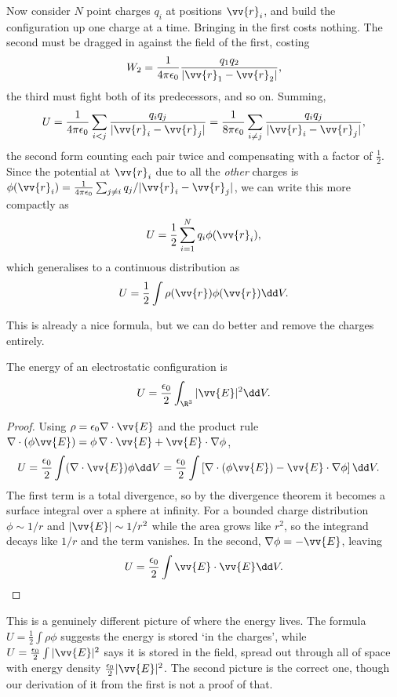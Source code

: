 Now consider $N$ point charges $q_i$ at positions $\vv{r}_i$, and build the configuration up one charge at a time. Bringing in the first costs nothing. The second must be dragged in against the field of the first, costing
$$
W_2 = \frac{1}{4\pi\epsilon_0}\frac{q_1q_2}{|\vv{r}_1-\vv{r}_2|},
$$
the third must fight both of its predecessors, and so on. Summing,
$$
U = \frac{1}{4\pi\epsilon_0}\sum_{i<j}\frac{q_iq_j}{|\vv{r}_i-\vv{r}_j|} = \frac{1}{8\pi\epsilon_0}\sum_{i\neq j}\frac{q_iq_j}{|\vv{r}_i-\vv{r}_j|},
$$
the second form counting each pair twice and compensating with a factor of $\tfrac12$. Since the potential at $\vv{r}_i$ due to all the \emph{other} charges is $\phi(\vv{r}_i) = \frac{1}{4\pi\epsilon_0}\sum_{j\neq i} q_j/|\vv{r}_i - \vv{r}_j|$, we can write this more compactly as
$$
U = \frac{1}{2}\sum_{i=1}^N q_i \phi(\vv{r}_i),
$$
which generalises to a continuous distribution as
$$
U = \frac{1}{2}\int \rho(\vv{r})\phi(\vv{r})\dd V.
$$

This is already a nice formula, but we can do better and remove the charges entirely.

\begin{proposition}
	\label{prop:E-energy}
	The energy of an electrostatic configuration is
	$$
	U = \frac{\epsilon_0}{2}\int_{\R^3} |\vv{E}|^2 \dd V.
	$$
\end{proposition}
\begin{proof}
	Using $\rho = \epsilon_0 \nabla \cdot \vv{E}$ and the product rule $\nabla\cdot(\phi \vv{E}) = \phi\, \nabla\cdot \vv{E} + \vv{E}\cdot\nabla\phi$,
	\begin{align*}
		U &= \frac{\epsilon_0}{2}\int (\nabla\cdot \vv{E})\phi \dd V = \frac{\epsilon_0}{2}\int \left[\nabla\cdot(\phi\vv{E}) - \vv{E}\cdot \nabla \phi\right]\dd V.
	\end{align*}
	The first term is a total divergence, so by the divergence theorem it becomes a surface integral over a sphere at infinity. For a bounded charge distribution $\phi \sim 1/r$ and $|\vv{E}| \sim 1/r^2$ while the area grows like $r^2$, so the integrand decays like $1/r$ and the term vanishes. In the second, $\nabla \phi = -\vv{E}$, leaving
	$$
	U = \frac{\epsilon_0}{2}\int \vv{E}\cdot \vv{E}\dd V. \qedhere
	$$
\end{proof}

This is a genuinely different picture of where the energy lives. The formula $U = \tfrac12 \int \rho\phi$ suggests the energy is stored `in the charges', while $U = \tfrac{\epsilon_0}{2}\int |\vv{E}|^2$ says it is stored in the field, spread out through all of space with energy density $\tfrac{\epsilon_0}{2}|\vv{E}|^2$. The second picture is the correct one, though our derivation of it from the first is not a proof of that.

